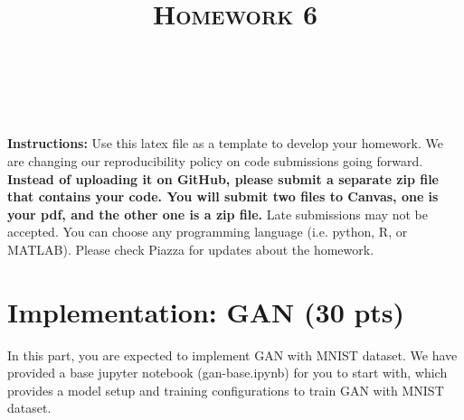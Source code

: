 \documentclass[a4paper]{article}
\title{\textsc{Homework 6}} %
\author{
	\red{APOORVA KUMAR} \\
	\red{908 461 5997}\\
}
\date{}
\theoremstyle{definition}
\begin{document}
	
	\maketitle 
	
        \textbf{Instructions:}
        Use this latex file as a template to develop your homework. We are changing our reproducibility policy on code submissions going forward. \textbf{Instead of uploading it on GitHub, please submit a separate zip file that contains your code. You will submit two files to Canvas, one is your pdf, and the other one is a zip file.} Late submissions may not be accepted. You can choose any programming language (i.e. python, R, or MATLAB). Please check Piazza for updates about the homework.
        \vspace{0.1in}
	
	\section{Implementation: GAN (30 pts)}
	In this part, you are expected to implement GAN with MNIST dataset. We have provided a base jupyter notebook (gan-base.ipynb) for you to start with, which provides a model setup and training configurations to train GAN with MNIST dataset.
	
\end{document}
